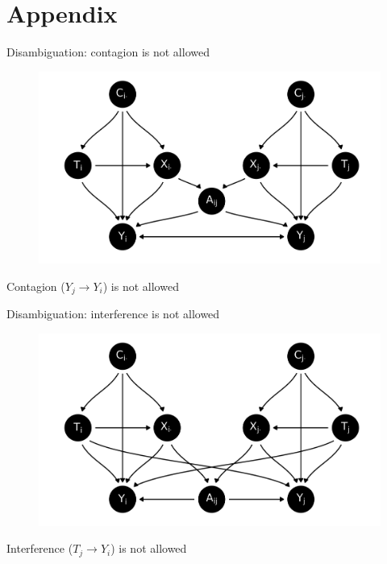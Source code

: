 \documentclass{beamer}
\theoremstyle{remark}
\begin{document}
\section{Appendix}

\begin{frame}{Disambiguation: contagion is not allowed}

    \centering

    \begin{figure}
        \includegraphics[scale=0.65]{figures/dags/contagion.png}
        \label{fig:contagion}
    \end{figure}

    Contagion ($Y_j \to Y_i$) is not allowed

\end{frame}

\begin{frame}{Disambiguation: interference is not allowed}

    \centering

    \begin{figure}
        \includegraphics[scale=0.65]{figures/dags/interference.png}
        \label{fig:interference}
    \end{figure}

    Interference ($T_j \to Y_i$) is not allowed

\end{frame}
\end{document}
